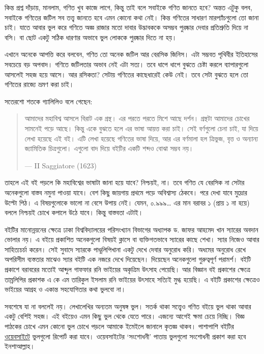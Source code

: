 \documentclass[
]{book}
\begin{document}
কিন্ত প্রশ্ন দাঁড়ায়, মানলাম, গণিত খুব কাজে লাগে, কিন্তু তাই বলে সবাইকে গণিত জানতে হবে? অন্তত এটুকু বলব, সবাইকে গণিতের জটিল সব তত্ত্ব জানতে হবে এমন কোনো কথা নেই। কিন্ত গণিতের সাধারণ মারপ্যাঁচগুলো তো জানা চাই। যাতে আবার ভুল করে গণিতে অজ্ঞ রাজার মতো দাবার উদ্ভাবককে অসম্ভব পুরষ্কার দেবার প্রতিশ্রুতি দিয়ে না বসি। বা ছোট একটু সঠিক ধারণার অভাবে ভুল লোককে পুরষ্কার দিতে না হয়।

এখানে অনেকে আপত্তি করে বলবেন, গণিত তো অনেক জটিল আর বেরসিক জিনিস। এটা সম্ভবত পৃথিবীর ইতিহাসের সবচেয়ে বড় অপবাদ। গণিতে জটিলতার অভাব নেই এটা সত্য। তবে ধাপে ধাপে বুঝতে চেষ্টা করলে ব্যাপারগুলো আসলেই সহজ হয়ে আসে। আর রসিকতা? সেটায় গণিতের কাছেধারেই কেউ নেই। তবে সেটা বুঝতে হলে তো গণিতের রাজ্যে ভ্রমণ করা চাই।

সতেরশো শতকে গ্যালিলিও বলে গেছেন:

\begin{quote}
আমাদের মহাবিশ্ব আসলে বিরাট এক গ্রন্থ। এর পরতে পরতে মিশে আছে দর্শন। গ্রন্থটা আমাদের চোখের সামনেই পড়ে আছে। কিন্তু একে বুঝতে হলে এর ভাষা আয়ত্ত করা চাই। সেই বর্ণগুলো চেনা চাই, যা দিয়ে লেখা হয়েছে এই বই। এটি লেখা হয়েছে গণিতের ভাষা দিয়ে, আর এর বর্ণমালা হল ত্রিভুজ, বৃত্ত ও অন্যান্য জ্যামিতিক চিত্রগুলো। এগুলো বাদ দিয়ে বইটির একটি শব্দও বোঝা সম্ভব নয়।

--- II Saggiatore (1623)
\end{quote}

তাহলে এই বই পড়লে কি মহাবিশ্বের ভাষাটা জানা হয়ে যাবে? নিশ্চয়ই, না। তবে গণিত যে বেরসিক না সেটার অনেকগুলো বাস্তব নমুনা পাওয়া যাবে। বেশ কিছু জায়গায় প্রথমে পড়ে অবিশ্বাস্য ঠেকবে। পরে দেখা যাবে মুদ্রোর উল্টো পিঠ। এ বিষয়গুলোকে ভালো না বেসে উপায় নেই। যেমন, ০.৯৯৯\ldots{} এর মান বরাবর ১ (প্রায় ১ না হয়ে) বললে নিশ্চয়ই চোখে কপালে উঠে যাবে। কিন্তু বাস্তবতা এটাই।

বইটির মানোন্নয়নের ক্ষেত্রে ঢাকা বিশ্ববিদ্যালয়ের পরিসংখ্যান বিভাগের অধ্যাপক ড. জাফর আহমেদ খান স্যারের অবদান ভোলার নয়। এ বইয়ে প্রকাশিত অনেকগুলো বিষয়ই ক্লাসে বা ব্যক্তিগতভাবে স্যারের কাছে শেখা। স্যার নিজেও আবার সাহিত্যচর্চা করেন। সেই সুবাদে স্যারকে পাণ্ডুলিপিখানা একটু দেখে দেবার অনুরোধ করি। অধমের অনুরোধ রেখে অপরিসীম ব্যস্ততার মাঝেও স্যার বইটি এক নজরে দেখে দিয়েছেন। দিয়েছেন অনেকগুলো গুরুত্বপূর্ণ পরামর্শ। বইটি প্রকাশে বরাবরের মতোই আব্দুল গাফফার রনি ভাইয়ের অকৃত্রিম উৎসাহ পেয়েছি। আর বিজ্ঞান বই প্রকাশের ক্ষেত্রে তাম্রলিপির প্রকাশক এ কে এম তারিকুল ইসলাম রনি ভাইয়ের উৎসাহে সত্যিই মুগ্ধ হয়েছি। এ বইটি প্রকাশের ক্ষেত্রেও ভাইয়ের আগ্রহ ও একান্ত সহযোগিতার কথা ভুলবো না।

সবশেষে যা না বললেই নয়। লেখালেখির অন্যতম অনুষঙ্গ ভুল। সতর্ক থাকা সত্ত্বেও গণিত বইয়ে ভুল থাকা আবার একটু বেশিই সহজ। এই বইয়েও এমন কিছু ভুল থেকে যেতে পারে। এজন্যে আগেই ক্ষমা চেয়ে নিচ্ছি। বিজ্ঞ পাঠকের চোখে এমন কোনো ভুল চোখে পড়লে আমাকে ইমেইলে জানালে কৃতজ্ঞ থাকব। পাশাপাশি বইটির \href{https://github.com/mahmudstat/os/issues/new}{ওয়েবসাইটে} ভুলগুলো রিপোর্ট করা যাবে। ওয়েবসাইটের `সংশোধনী' পাতায় ভুলগুলো সংশোধনী প্রকাশ করা হবে ইনশাআল্লাহ।
\end{document}

